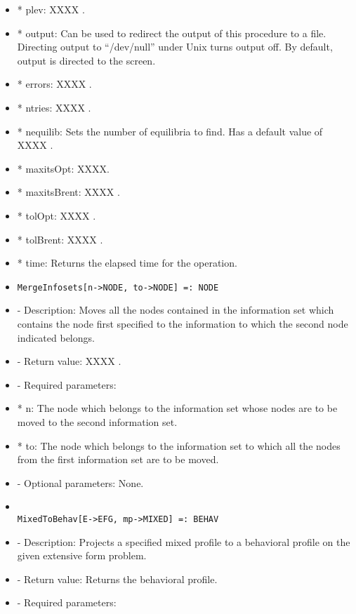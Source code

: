 \begin{itemize}
\bd
\item
*  plev: XXXX .
\item
*  output:  Can be used to redirect the output of this procedure to a
file.  Directing output to ``/dev/null'' under Unix turns output off.
By default, output is directed to the screen.
\item
*  errors:  XXXX .
\item
*  ntries:  XXXX .
\item
*  nequilib:  Sets the number of equilibria to find.  Has a default 
value of XXXX . 
\item
*  maxitsOpt:  XXXX.
\item
*  maxitsBrent:  XXXX .
\item
*  tolOpt:  XXXX . 
\item
*  tolBrent:  XXXX .
\item
*  time:  Returns the elapsed time for the operation.
\ed
\ed

\item
\begin{verbatim}
MergeInfosets[n->NODE, to->NODE] =: NODE
\end{verbatim}

\bd
\item
- Description:  Moves all the nodes contained in the information set 
which contains the node first specified to the information to which the
second node indicated belongs.
\item
- Return value:  XXXX .
\item
- Required parameters:

\bd
\item
*  n:  The node which belongs to the information set whose nodes are
to be moved to the second information set.
\item
*  to:  The node which belongs to the information set to which all
the nodes from the first information set are to be moved.
\ed

\item
- Optional parameters:  None.
\ed

\item
\begin{verbatim}

MixedToBehav[E->EFG, mp->MIXED] =: BEHAV
\end{verbatim}

\bd
\item
- Description:  Projects a specified mixed profile to a behavioral 
profile on the given extensive form problem.
\item
- Return value:  Returns the behavioral profile.
\item
- Required parameters:


\end{itemize}
